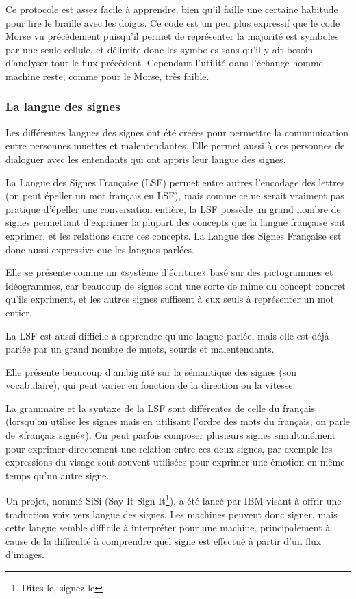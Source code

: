 \documentclass[french,a4paper]{article}
\begin{document}
Ce protocole est assez facile à apprendre, bien qu'il faille une certaine habitude pour lire le braille avec les doigts. Ce code est un peu
plus expressif que le code Morse vu précédement puisqu'il permet de représenter la majorité est symboles par une seule cellule, et délimite
donc les symboles sans qu'il y ait besoin d'analyser tout le flux précédent. Cependant l'utilité dans l'échange homme-machine reste, comme
pour le Morse, très faible.

\subsubsection{La langue des signes}
Les différentes langues des signes ont été créées pour permettre la
communication entre personnes muettes et malentendantes. Elle permet
aussi à ces personnes de dialoguer avec les entendants qui ont appris
leur langue des signes.

La Langue des Signes Française (LSF) permet entre autres l'encodage
des lettres (on peut épeller un mot français en LSF), mais comme ce ne
serait vraiment pas pratique d'épeller une conversation entière, la
LSF possède un grand nombre de signes permettant d'exprimer la plupart
des concepts que la langue française sait exprimer, et les relations
entre ces concepts. La Langue des Signes Française est donc aussi
expressive que les langues parlées.

Elle se présente comme un «système d'écriture» basé sur des
pictogrammes et idéogrammes, car beaucoup de signes sont une sorte de
mime du concept concret qu'ils expriment, et les autres signes
suffisent à eux seuls à représenter un mot entier.

La LSF est aussi difficile à apprendre qu'une langue parlée, mais elle
est déjà parlée par un grand nombre de muets, sourds et malentendants.

Elle présente beaucoup d'ambigüité sur la sémantique des signes (son
vocabulaire), qui peut varier en fonction de la direction ou la
vitesse.

La grammaire et la syntaxe de la LSF sont différentes de celle du
français (lorsqu'on utilise les signes mais en utilisant l'ordre des
mots du français, on parle de «français signé»). On peut parfois
composer plusieurs signes simultanément pour exprimer directement une
relation entre ces deux signes, par exemple les expressions du visage
sont souvent utilisées pour exprimer une émotion en même temps qu'un
autre signe.

Un projet, nommé SiSi (Say It Sign It\footnote{Dites-le, signez-le}),
a été lancé par IBM visant à offrir une traduction voix vers langue
des signes. Les machines peuvent donc signer, mais cette langue semble
difficile à interpréter pour une machine, principalement à cause de la
difficulté à comprendre quel signe est effectué à partir d'un flux
d'images.
\end{document}
